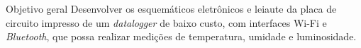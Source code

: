 \begin{frame}{Objetivo geral}
    Desenvolver os esquemáticos eletrônicos e leiaute da placa de circuito impresso de um \textit{datalogger} de baixo custo, com interfaces Wi-Fi e \textit{Bluetooth}, que possa realizar medições de temperatura, umidade e luminosidade. 
    
    
    
    
    

    


\end{frame}



